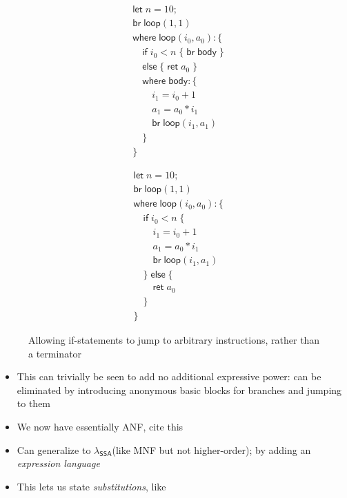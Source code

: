 \documentclass[acmsmall,screen,review]{acmart}
\newcommand{\ms}[1]{\ensuremath{\mathsf{#1}}}
\newcommand{\isotopessa}{\(\lambda_{\ms{SSA}}\)}
\begin{document}
\begin{figure}
  \centering
  \begin{subfigure}[t]{.5\textwidth}
    \begin{align*}
      & \ms{let}\;n = 10; \\
      & \ms{br}\;\ms{loop}(1, 1) \\
      & \ms{where}\;\ms{loop}(i_0, a_0): \{ \\
      & \quad \ms{if}\;i_0 < n\;\{\;\ms{br}\;\ms{body}\;\} \\
      & \quad \ms{else}\;\{\;\ms{ret}\;a_0\;\} \\
      & \quad \ms{where}\;\ms{body}: \{\\ 
      & \qquad i_1 = i_0 + 1 \\
      & \qquad a_1 = a_0 * i_1 \\
      & \qquad \ms{br}\;\ms{loop}(i_1, a_1) \\
      & \quad \} \\
      & \}
    \end{align*}
  \end{subfigure}%
  \begin{subfigure}[t]{.5\textwidth}
    \begin{align*}
      & \ms{let}\;n = 10; \\
      & \ms{br}\;\ms{loop}(1, 1) \\
      & \ms{where}\;\ms{loop}(i_0, a_0): \{\\
      & \quad \ms{if}\;i_0 < n\;\{ \\
      & \qquad i_1 = i_0 + 1 \\
      & \qquad a_1 = a_0 * i_1 \\
      & \qquad \ms{br}\;\ms{loop}(i_1, a_1) \\
      & \quad \}\;\ms{else}\;\{ \\
      & \qquad \ms{ret}\;a_0 \\
      & \quad \} \\
      & \}
    \end{align*}
  \end{subfigure}
  \caption{Allowing if-statements to jump to arbitrary instructions, rather than a terminator}
  \Description{}
\end{figure}

\begin{itemize}
  \item This can trivially be seen to add no additional expressive power: can be eliminated by
        introducing anonymous basic blocks for branches and jumping to them
  \item We now have essentially ANF, cite this
  \item Can generalize to \isotopessa (like MNF but not higher-order); by adding an \textit{expression
  language}
  \item This lets us state \textit{substitutions}, like
\end{itemize}
\end{document}
